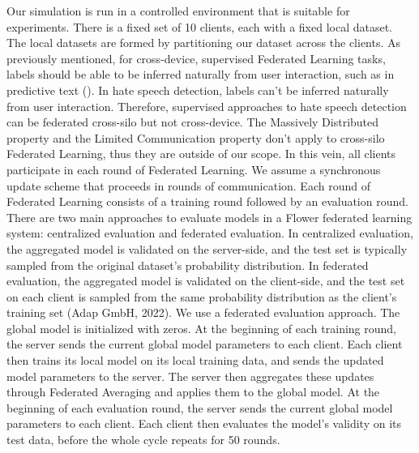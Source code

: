 \documentclass[letterpaper]{article} %
\begin{document}
Our simulation is run in a controlled environment that is suitable for experiments. There is a fixed set of 10 clients, each with a fixed local dataset. The local datasets are formed by partitioning our dataset across the clients. As previously mentioned, for cross-device, supervised Federated Learning tasks, labels should be able to be inferred naturally from user interaction, such as in predictive text (). In hate speech detection, labels can’t be inferred naturally from user interaction. Therefore, supervised approaches to hate speech detection can be federated cross-silo but not cross-device. The Massively Distributed property and the Limited Communication property don't apply to cross-silo Federated Learning, thus they are outside of our scope. In this vein, all clients participate in each round of Federated Learning. We assume a synchronous update scheme that proceeds in rounds of communication. Each round of Federated Learning consists of a training round followed by an evaluation round. There are two main approaches to evaluate models in a Flower federated learning system: centralized evaluation and federated evaluation. In centralized evaluation, the aggregated model is validated on the server-side, and the test set is typically sampled from the original dataset's probability distribution. In federated evaluation, the aggregated model is validated on the client-side, and the test set on each client is sampled from the same probability distribution as the client's training set (Adap GmbH, 2022). We use a federated evaluation approach. The global model is initialized with zeros. At the beginning of each training round, the server sends the current global model parameters to each client. Each client then trains its local model on its local training data, and sends the updated model parameters to the server. The server then aggregates these updates through Federated Averaging and applies them to the global model. At the beginning of each evaluation round, the server sends the current global model parameters to each client. Each client then evaluates the model's validity on its test data, before the whole cycle repeats for 50 rounds.
\end{document}
